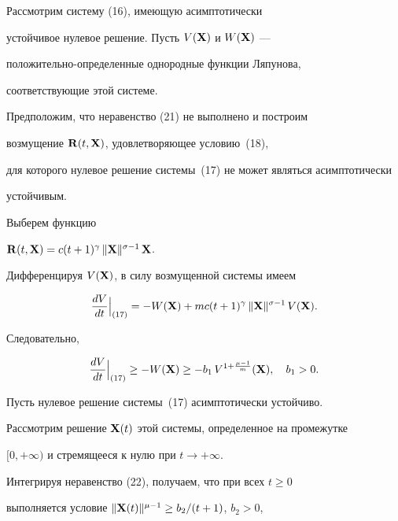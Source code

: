 \begin{pf}


Рассмотрим систему (16), имеющую асимптотически


устойчивое нулевое решение. Пусть $V(\bold X)$ и $W(\bold X)$ ---


положительно-определенные однородные функции Ляпунова, 


соответствующие этой системе.





Предположим, что неравенство (21) не выполнено и построим


возмущение $\bold R(t,\bold X)$, удовлетворяющее условию~(18),


для которого нулевое решение системы~(17) не может являться асимптотически


устойчивым.





Выберем функцию


$\bold R(t,\bold X)=c (t+1)^\gamma \, \|\bold X\|^{\sigma-1} \,\bold X$.


Дифференцируя $V(\bold X)$, в силу возмущенной системы имеем


$$


\frac{dV}{dt} \Big|_{(17)} = -


W(\bold X)+ m  c  (t+1)^\gamma \, \|\bold X\|^{\sigma-1} \,V(\bold X).


$$


Следовательно,


\begin{equation}


\frac{dV}{dt} \Big|_{(17)} \geq -W(\bold X) \geq


-b_1 \, V^{1+\frac{\mu-1}m}(\bold X), \quad b_1>0.


\end{equation}





Пусть нулевое решение системы~(17) асимптотически устойчиво.


Рассмотрим решение $\bold X(t)$ этой системы, определенное на промежутке


$[0, +\infty)$ и стремящееся к нулю при $t\to +\infty$.





Интегрируя неравенство (22), получаем, что при всех $t\geq 0$


выполняется условие $\|\bold X(t)\|^{\mu-1}\geq b_2/(t+1)$, $b_2>0$,



\end{pf}
